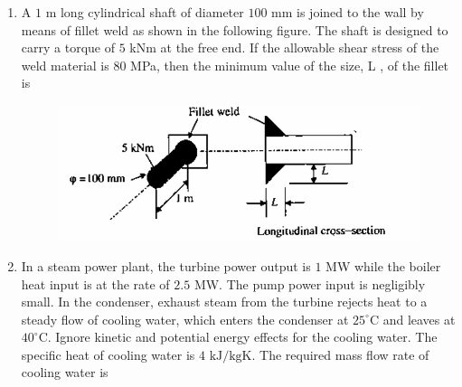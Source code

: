 \documentclass[journal,12pt,onecolumn]{IEEEtran}
\theoremstyle{remark}
\begin{document}
\begin{enumerate}
\item A $1$ m long cylindrical shaft of diameter $100$ mm is joined to the wall by means of fillet weld as shown in the following figure. The shaft is designed to carry a torque of $5$ kNm at the free end. If the allowable shear stress of the weld material is $80$ MPa, then the minimum value of the size, L , of the fillet  is
\begin{figure}[H]
\centering
\includegraphics[width=0.8\columnwidth]{q38.png}
\caption*{}
\label{fig:q38}
\end{figure}
\hfill{}
\begin{enumerate}
\end{enumerate}

\item In a steam power plant, the turbine power output is $1$ MW while the boiler heat input is at the rate of $2.5$ MW. The pump power input is negligibly small. In the condenser, exhaust steam from the turbine rejects heat to a steady flow of cooling water, which enters the condenser at $25^{\circ}\text{C}$ and leaves at $40^{\circ}\text{C}$. Ignore kinetic and potential energy effects for the cooling water. The specific heat of cooling water is $4 \text{ kJ/kgK}$. The required mass flow rate  of cooling water is
\hfill{}
\begin{enumerate}
\end{enumerate}


\end{enumerate}
\end{document}
